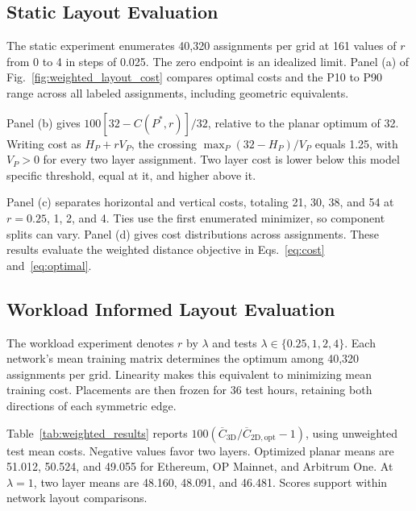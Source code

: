 \documentclass[runningheads]{llncs}
\begin{document}
\subsection{Static Layout Evaluation}
The static experiment enumerates 40,320 assignments per grid at 161 values of $r$ from 0 to 4 in steps of 0.025. The zero endpoint is an idealized limit. Panel (a) of Fig.~\ref{fig:weighted_layout_cost} compares optimal costs and the P10 to P90 range across all labeled assignments, including geometric equivalents.

Panel (b) gives $100[32-C(P^*,r)]/32$, relative to the planar optimum of 32. Writing cost as $H_P+rV_P$, the crossing $\max_P(32-H_P)/V_P$ equals 1.25, with $V_P>0$ for every two layer assignment. Two layer cost is lower below this model specific threshold, equal at it, and higher above it.

Panel (c) separates horizontal and vertical costs, totaling 21, 30, 38, and 54 at $r=0.25$, 1, 2, and 4. Ties use the first enumerated minimizer, so component splits can vary. Panel (d) gives cost distributions across assignments. These results evaluate the weighted distance objective in Eqs.~\eqref{eq:cost} and~\eqref{eq:optimal}.

\FloatBarrier
\subsection{Workload Informed Layout Evaluation}

The workload experiment denotes $r$ by $\lambda$ and tests $\lambda\in\{0.25,1,2,4\}$. Each network's mean training matrix determines the optimum among 40,320 assignments per grid. Linearity makes this equivalent to minimizing mean training cost. Placements are then frozen for 36 test hours, retaining both directions of each symmetric edge.

Table~\ref{tab:weighted_results} reports $100(\overline{C}_{\mathrm{3D}}/\overline{C}_{\mathrm{2D,opt}}-1)$, using unweighted test mean costs. Negative values favor two layers. Optimized planar means are 51.012, 50.524, and 49.055 for Ethereum, OP Mainnet, and Arbitrum One. At $\lambda=1$, two layer means are 48.160, 48.091, and 46.481. Scores support within network layout comparisons.
\end{document}
